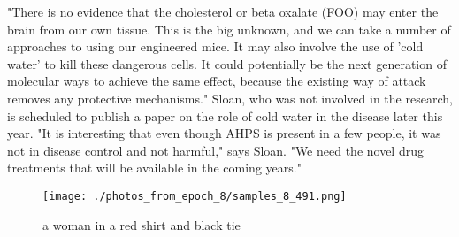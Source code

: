 \documentclass{article}%
\begin{document}
"There is no evidence that the cholesterol or beta oxalate (FOO) may enter the brain from our own tissue. This is the big unknown, and we can take a number of approaches to using our engineered mice. It may also involve the use of 'cold water' to kill these dangerous cells. It could potentially be the next generation of molecular ways to achieve the same effect, because the existing way of attack removes any protective mechanisms."\newline%
Sloan, who was not involved in the research, is scheduled to publish a paper on the role of cold water in the disease later this year.\newline%
"It is interesting that even though AHPS is present in a few people, it was not in disease control and not harmful," says Sloan. "We need the novel drug treatments that will be available in the coming years."\newline%

%


\begin{figure}[h!]%
\centering%
\texttt{[image: ./photos\_from\_epoch\_8/samples\_8\_491.png]}%
\caption{a woman in a red shirt and black tie}%
\end{figure}

%
\end{document}
